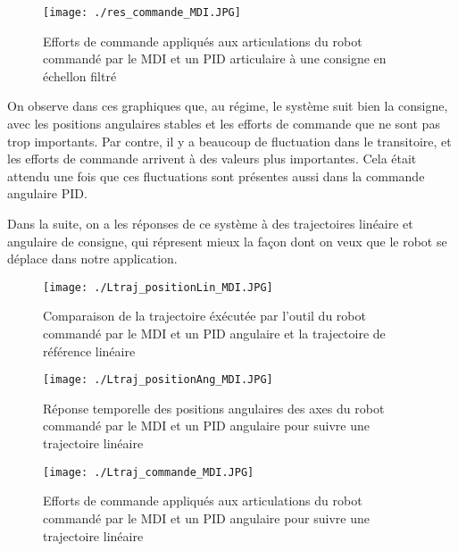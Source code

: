 \begin{figure}[H]
	\begin{center}
		\captionsetup{justification=centering,margin=1cm}	
		\texttt{[image: ./res\_commande\_MDI.JPG]}
		\caption{Efforts de commande appliqués aux articulations du robot commandé par le MDI et un PID articulaire à une consigne en échellon filtré}
		\label{fig:res_commande_MDI}
	\end{center}
\end{figure}

On observe dans ces graphiques que, au régime, le système suit bien la consigne, avec les positions angulaires stables et les efforts de commande que ne sont pas trop importants. Par contre, il y a beaucoup de fluctuation dans le transitoire, et les efforts de commande arrivent à des valeurs plus importantes. Cela était attendu une fois que ces fluctuations sont présentes aussi dans la commande angulaire PID.

Dans la suite, on a les réponses de ce système à des trajectoires linéaire et angulaire de consigne, qui répresent mieux la façon dont on veux que le robot se déplace dans notre application. 

\begin{figure}[H]
	\begin{center}	
		\captionsetup{justification=centering,margin=1cm}
		\texttt{[image: ./Ltraj\_positionLin\_MDI.JPG]}
		\caption{Comparaison de la trajectoire éxécutée par l'outil du robot commandé par le MDI et un PID angulaire et la trajectoire de référence linéaire}
		\label{fig:Ltraj_positionLin_MDI}
	\end{center}
\end{figure}

\begin{figure}[H]
	\begin{center}	
		\captionsetup{justification=centering,margin=1cm}
		\texttt{[image: ./Ltraj\_positionAng\_MDI.JPG]}
		\caption{Réponse temporelle des positions angulaires des axes du robot commandé par le MDI et un PID angulaire pour suivre une trajectoire linéaire}
		\label{fig:Ltraj_positionAng_MDI}
	\end{center}
\end{figure}
\newpage
\begin{figure}[H]
	\begin{center}
		\captionsetup{justification=centering,margin=1cm}	
		\texttt{[image: ./Ltraj\_commande\_MDI.JPG]}
		\caption{Efforts de commande appliqués aux articulations du robot commandé par le MDI et un PID angulaire pour suivre une trajectoire linéaire}
		\label{fig:Ltraj_commande_MDI}
	\end{center}
\end{figure}

